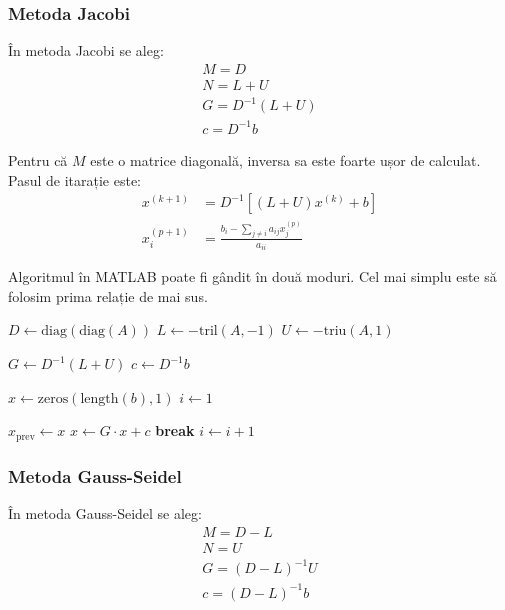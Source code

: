 \documentclass{exam}
\begin{document}
\subsubsection{Metoda Jacobi}
În metoda Jacobi se aleg:
\begin{gather*}
	M = D \\
	N = L + U \\
	G = D^{-1}(L + U) \\
	c = D^{-1}b
\end{gather*}

Pentru că $M$ este o matrice diagonală, inversa sa este foarte ușor de calculat.
Pasul de itarație este:
\begin{align*}
	x^{(k + 1)} & = D^{-1}[(L + U)x^{(k)} + b]                            \\
	x_i^{(p+1)} & = \frac{b_i - \sum_{j \neq i} a_{ij} x_j^{(p)}}{a_{ii}}
\end{align*}

Algoritmul în MATLAB poate fi gândit în două moduri. Cel mai simplu este să
folosim prima relație de mai sus.

\begin{algorithm}
	\caption{Metoda Jacobi}
	\begin{algorithmic}[1]
		\State \( D \gets \text{diag}(\text{diag}(A)) \) 
		\State \( L \gets -\text{tril}(A, -1) \) 
		\State \( U \gets -\text{triu}(A, 1) \) 

		\State \( G \gets D^{-1} (L + U) \) 
		\State \( c \gets D^{-1} b \) 

		\State \( x \gets \text{zeros}(\text{length}(b),1) \) 
		\State \( i \gets 1 \)

		\State \( x_{\text{prev}} \gets x \)
		\State \( x \gets G \cdot x + c \)
		\State \textbf{break}
		\EndIf
		\State \( i \gets i + 1 \)
		\EndWhile
	\end{algorithmic}
\end{algorithm}

\subsubsection{Metoda Gauss-Seidel}

În metoda Gauss-Seidel se aleg:
\begin{gather*}
	M = D - L \\
	N = U \\
	G = (D - L)^{-1} U \\
	c = (D - L)^{-1} b
\end{gather*}
\end{document}
